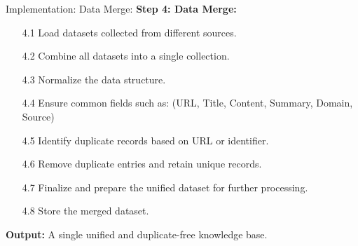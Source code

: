 \begin{frame}{Implementation: Data Merge:}
    \textbf{Step 4: Data Merge:}
        \begin{itemize}
        
            \item[4.1] Load datasets collected from different sources.
            \item[4.2] Combine all datasets into a single collection.
        
            \item[4.3] Normalize the data structure.
            \item[4.4] Ensure common fields such as:
                       (URL, Title, Content, Summary, Domain, Source)
        
            \item[4.5] Identify duplicate records based on URL or identifier.
            \item[4.6] Remove duplicate entries and retain unique records.
        
            \item[4.7] Finalize and prepare the unified dataset for further processing.
            \item[4.8] Store the merged dataset.
        
        \end{itemize}
        
        \textbf{Output:} A single unified and duplicate-free knowledge base.

\end{frame}

